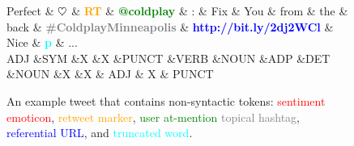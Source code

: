 \documentclass[11pt,a4paper]{article}
\newcommand{\heart}{\ensuremath\heartsuit}
\begin{document}
\begin{figure}[t]
	\centering
	\small
	\begin{dependency}[edge slant=2, text only label, label style=above]
		\begin{deptext}
			Perfect \& \textcolor{red}{\bf $\heart$} \& \textcolor{orange}{\bf RT} \& \textcolor{green}{\bf @coldplay} \& : \& Fix \& You \& from \& the \& back \& \textcolor{gray}{\bf \#ColdplayMinneapolis} \& \textcolor{blue}{\bf http://bit.ly/2dj2WCl} \& Nice \& \textcolor{cyan}{\bf p} \& ...\\
			\tiny ADJ \&\tiny SYM \&\tiny X \&\tiny X \&\tiny PUNCT \&\tiny VERB \&\tiny NOUN \&\tiny ADP \&\tiny DET \&\tiny NOUN \&\tiny X \&\tiny X \& \tiny ADJ \& \tiny X \& \tiny PUNCT \\
		\end{deptext}
	\end{dependency}
	\caption{An example tweet that contains non-syntactic tokens:
		\textcolor{red}{sentiment emoticon},
		\textcolor{orange}{retweet marker},
		\textcolor{green}{user at-mention}
		\textcolor{gray}{topical hashtag},
		\textcolor{blue}{referential URL}, and
		\textcolor{cyan}{truncated word}.}\label{fig:non-syn-toks}
\end{figure}
\end{document}
